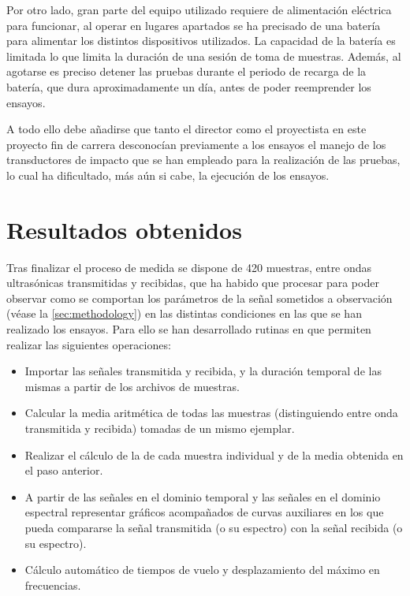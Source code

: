 Por otro lado, gran parte del equipo utilizado requiere de alimentación
eléctrica para funcionar, al operar en lugares apartados se ha precisado de
una batería para alimentar los distintos dispositivos utilizados. La
capacidad de la batería es limitada lo que limita la duración de una sesión
de toma de muestras. Además, al agotarse es preciso detener las pruebas
durante el periodo de recarga de la batería, que dura aproximadamente un
día, antes de poder reemprender los ensayos.

A todo ello debe añadirse que tanto el director como el proyectista en este
proyecto fin de carrera desconocían previamente a los ensayos el manejo de
los transductores de impacto que se han empleado para la realización de las
pruebas, lo cual ha dificultado, más aún si cabe, la ejecución de los
ensayos.


\section{Resultados obtenidos}

Tras finalizar el proceso de medida se dispone de 420 muestras, entre ondas
ultrasónicas transmitidas y recibidas, que ha habido que procesar para
poder observar como se comportan los parámetros de la señal sometidos a
observación (véase la \vref{sec:methodology}) en las distintas condiciones
en las que se han realizado los ensayos. Para ello se han desarrollado
rutinas en \matlab{} que permiten realizar las siguientes operaciones:

\begin{itemize}
    \item Importar las señales transmitida y recibida, y la duración
	temporal de las mismas a partir de los archivos de muestras.
    \item Calcular la media aritmética de todas las muestras (distinguiendo
	entre onda transmitida y recibida) tomadas de un mismo ejemplar.
    \item Realizar el cálculo de la  de cada muestra individual y
	de la media obtenida en el paso anterior.
    \item A partir de las señales en el dominio temporal y las señales en
	el dominio espectral representar gráficos acompañados de curvas
	auxiliares en los que pueda compararse la señal transmitida (o su
	espectro) con la señal recibida (o su espectro).
    \item Cálculo automático de tiempos de vuelo y desplazamiento del
	máximo en frecuencias.
\end{itemize}

